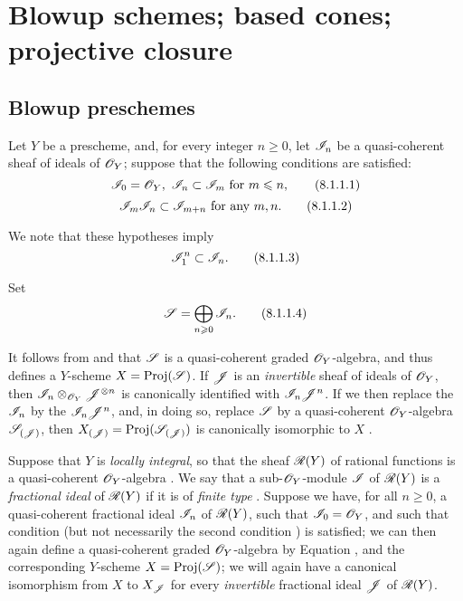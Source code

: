 \section{Blowup schemes; based cones; projective closure}
\label{section:2.8}


\subsection{Blowup preschemes}
\label{subsection:2.8.1}

\begin{env}[8.1.1]
\label{2.8.1.1}
Let $Y$ be a prescheme, and, for every integer $n\geq 0$, let $\mathscr{I}_n$ be a quasi-coherent sheaf of ideals of $\mathscr{O}_Y$; suppose that the following conditions are satisfied:
\[
\label{eq:2.8.1.1.1}
  \mathscr{I}_0=\mathscr{O}_Y,\ \mathscr{I}_n\subset\mathscr{I}_m\text{ for }m\leqslant n,
\tag{8.1.1.1}
\]
\[
\label{eq:2.8.1.1.2}
  \mathscr{I}_m\mathscr{I}_n\subset\mathscr{I}_{m+n}\text{ for any }m,n.
\tag{8.1.1.2}
\]

We note that these hypotheses imply
\[
\label{eq:2.8.1.1.3}
  \mathscr{I}_1^n\subset\mathscr{I}_n.
\tag{8.1.1.3}
\]

Set
\[
\label{eq:2.8.1.1.4}
  \mathscr{S}=\bigoplus_{n\geqslant 0}\mathscr{I}_n.
\tag{8.1.1.4}
\]

It follows from  and  that $\mathscr{S}$ is a quasi-coherent graded $\mathscr{O}_Y$-algebra, and thus defines a $Y$-scheme $X=\operatorname{Proj}(\mathscr{S})$.
If $\mathscr{J}$ is an \emph{invertible} sheaf of ideals of $\mathscr{O}_Y$, then $\mathscr{I}_n\otimes_{\mathscr{O}_Y}\mathscr{J}^{\otimes n}$ is canonically identified with $\mathscr{I}_n\mathscr{J}^n$.
If we then replace the $\mathscr{I}_n$ by the $\mathscr{I}_n\mathscr{J}^n$, and, in doing so, replace $\mathscr{S}$ by a quasi-coherent $\mathscr{O}_Y$-algebra $\mathscr{S}_{(\mathscr{J})}$, then $X_{(\mathscr{J})}=\operatorname{Proj}(\mathscr{S}_{(\mathscr{J})})$ is canonically isomorphic to $X$ .
\end{env}

\begin{env}[8.1.2]
\label{2.8.1.2}
Suppose that $Y$ is \emph{locally integral}, so that the sheaf $\mathscr{R}(Y)$ of rational functions is a quasi-coherent $\mathscr{O}_Y$-algebra .
We say that a sub-$\mathscr{O}_Y$-module $\mathscr{I}$ of $\mathscr{R}(Y)$ is a \emph{fractional ideal} of $\mathscr{R}(Y)$ if it is of \emph{finite type} .
Suppose we have, for all $n\geq0$, a quasi-coherent fractional ideal $\mathscr{I}_n$ of $\mathscr{R}(Y)$, such that $\mathscr{I}_0 = \mathscr{O}_Y$, and such that condition  (but not necessarily the second condition ) is satisfied;
we can then again define a quasi-coherent graded $\mathscr{O}_Y$-algebra by Equation , and the corresponding $Y$-scheme $X = \operatorname{Proj}(\mathscr{S})$;
we will again have a canonical isomorphism from $X$ to $X_{{\mathscr{J}}}$ for every \emph{invertible} fractional ideal $\mathscr{J}$ of $\mathscr{R}(Y)$.
\end{env}

